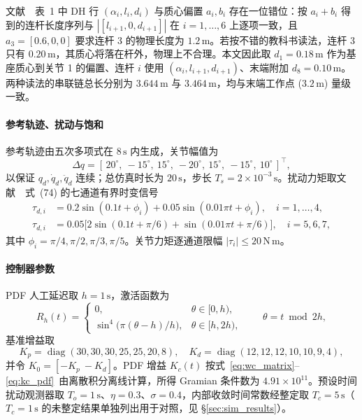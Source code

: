 \begin{remark}[参数的读取方式]
  文献~\cite{dou2025fractional}~表~1 中 DH 行 \((\alpha_i,l_i,d_i)\) 与质心偏置 \(a_i,b_i\) 存在一位错位：按 \(a_i+b_i\) 得到的连杆长度序列与 \(|[l_{i+1},0,d_{i+1}]|\) 在 \(i=1,\ldots,6\) 上逐项一致，且 \(a_3=[0.6,0,0]\) 要求连杆 3 的物理长度为 \(1.2\,\mathrm{m}\)。若按不错的教科书读法，连杆 3 只有 \(0.20\,\mathrm{m}\)，其质心将落在杆外，物理上不合理。本文因此取 \(d_1=0.18\,\mathrm{m}\) 作为基座质心到关节 1 的偏置、连杆 \(i\) 使用 \((\alpha_i,l_{i+1},d_{i+1})\)、末端附加 \(d_8=0.10\,\mathrm{m}\)。两种读法的串联链总长分别为 \(3.644\,\mathrm{m}\) 与 \(3.464\,\mathrm{m}\)，均与末端工作点 (\(3.2\,\mathrm{m}\)) 量级一致。
\end{remark}

\paragraph{参考轨迹、扰动与饱和}
参考轨迹由五次多项式在 \(8\,\mathrm{s}\) 内生成，关节幅值为
\[
\Delta q=[\,20^\circ,\ -15^\circ,\ 15^\circ,\ -20^\circ,\ 15^\circ,\ -15^\circ,\ 10^\circ\,]^\top ,
\]
以保证 \(q_d,\dot q_d,\ddot q_d\) 连续；总仿真时长为 \(20\,\mathrm{s}\)，步长 \(T_s=2\times10^{-3}\,\mathrm{s}\)。扰动力矩取文献~\cite{dou2025fractional}~式~(74) 的七通道有界时变信号
\[
\begin{aligned}
\tau_{d,i} &= 0.2\sin(0.1t+\phi_i)+0.05\sin(0.01\pi t+\phi_i),\quad i=1,\ldots,4,\\
\tau_{d,i} &= 0.05\bigl[2\sin(0.1t+\pi/6)+\sin(0.01\pi t+\pi/6)\bigr],\quad i=5,6,7,
\end{aligned}
\]
其中 \(\phi_i=\pi/4,\pi/2,\pi/3,\pi/5\)。关节力矩逐通道限幅 \(|\tau_i|\le 20\,\mathrm{N\,m}\)。

\paragraph{控制器参数}
PDF 人工延迟取 \(h=1\,\mathrm{s}\)，激活函数为
\[
R_h(t)=
\begin{cases}
0, & \theta\in[0,h),\\
\sin^4\bigl(\pi(\theta-h)/h\bigr), & \theta\in[h,2h),
\end{cases}
\qquad \theta=t\bmod 2h ,
\]
基准增益取
\[
K_p=\operatorname{diag}(30,30,30,25,25,20,8),\quad
K_d=\operatorname{diag}(12,12,12,10,10,9,4),
\]
并令 \(K_0=[-K_p\ -K_d]\)。PDF 增益 \(K_c(t)\) 按式~\eqref{eq:wc_matrix}--\eqref{eq:kc_pdf}~由离散积分离线计算，所得 Gramian 条件数为 \(4.91\times10^{11}\)。预设时间扰动观测器取 \(T_o=1\,\mathrm{s}\)、\(\eta=0.3\)、\(\sigma=0.4\)，内部收敛时间常数经整定取 \(T_c=5\,\mathrm{s}\)（\(T_c=1\,\mathrm{s}\) 的未整定结果单独列出用于对照，见 \S\ref{sec:sim_results}）。

